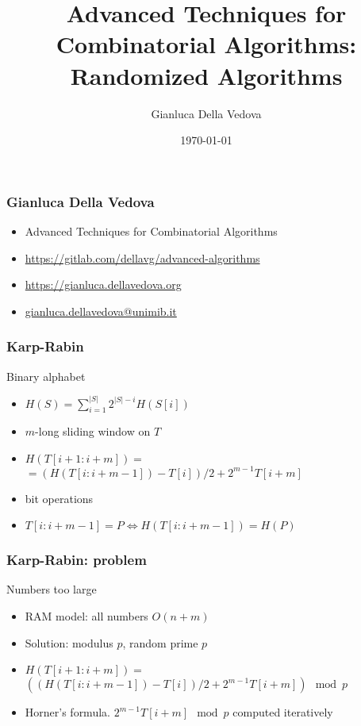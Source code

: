 \documentclass[14pt,aspectratio=169]{beamer}
\author{Gianluca Della Vedova}
\title[Advanced Algorithms]{Advanced Techniques for Combinatorial Algorithms:
Randomized Algorithms}
\institute[]{Univ. Milano--Bicocca\\
  \texttt{https://gianluca.dellavedova.org}}
\date[]{{\tiny \today\hspace{1em} \vcsShortHash}}
\begin{document}
\begin{frame}
  \titlepage
\end{frame}


\begin{frame}\frametitle{Gianluca Della Vedova}
  \begin{itemize}
  \item
                Advanced Techniques for Combinatorial Algorithms
\item
{\small\url{https://gitlab.com/dellavg/advanced-algorithms}}
  \item
{\small\url{https://gianluca.dellavedova.org}}
  \item
{\small\url{gianluca.dellavedova@unimib.it}}
  \end{itemize}
\end{frame}

\begin{frame}[fragile]
\frametitle{Karp-Rabin}
\begin{block}{Binary alphabet}
\begin{itemize}
\item
$H(S)=\sum_{i=1}^{|S|} 2^{|S| - i}H(S[i])$
\item
$m$-long sliding window on $T$
\item
$H(T[i+1:i+m]) =$\\
$=\left(H(T[i:i+m-1]) - T[i] \right) / 2 + 2^{m-1}T[i+m]$
\item
bit operations
\item
$T[i:i+m-1]=P \Leftrightarrow H(T[i:i+m-1])=H(P)$
\end{itemize}
\end{block}
\end{frame}

\begin{frame}[fragile]
\frametitle{Karp-Rabin: problem}
\begin{block}{Numbers too large}
\begin{itemize}
\item
RAM model: all numbers $O(n+m)$
\item
Solution: modulus $p$, random prime $p$
\item
$H(T[i+1:i+m]) =$\\
$\left(\left(H(T[i:i+m-1]) - T[i] \right) / 2 + 2^{m-1}T[i+m] \right)\mod p$
\item
Horner's formula.
%
$2^{m-1}T[i+m] \mod p$ computed iteratively
\end{itemize}
\end{block}
\end{frame}
\end{document}
